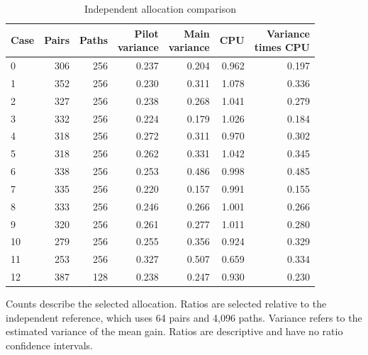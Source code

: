 \documentclass[11pt]{article}
\begin{document}
\begin{table}[htbp]
\centering\small
\caption{Independent allocation comparison}\label{tab:allocation-comparison}
\setlength{\tabcolsep}{4pt}
\begin{tabular}{lrrrrrr}
\toprule
Case & Pairs & Paths & \shortstack{Pilot\\variance} & \shortstack{Main\\variance} & CPU & \shortstack{Variance\\times CPU} \\
\midrule
0 & 306 & 256 & 0.237 & 0.204 & 0.962 & 0.197 \\
1 & 352 & 256 & 0.230 & 0.311 & 1.078 & 0.336 \\
2 & 327 & 256 & 0.238 & 0.268 & 1.041 & 0.279 \\
3 & 332 & 256 & 0.224 & 0.179 & 1.026 & 0.184 \\
4 & 318 & 256 & 0.272 & 0.311 & 0.970 & 0.302 \\
5 & 318 & 256 & 0.262 & 0.331 & 1.042 & 0.345 \\
6 & 338 & 256 & 0.253 & 0.486 & 0.998 & 0.485 \\
7 & 335 & 256 & 0.220 & 0.157 & 0.991 & 0.155 \\
8 & 333 & 256 & 0.246 & 0.266 & 1.001 & 0.266 \\
9 & 320 & 256 & 0.261 & 0.277 & 1.011 & 0.280 \\
10 & 279 & 256 & 0.255 & 0.356 & 0.924 & 0.329 \\
11 & 253 & 256 & 0.327 & 0.507 & 0.659 & 0.334 \\
12 & 387 & 128 & 0.238 & 0.247 & 0.930 & 0.230 \\
\bottomrule
\end{tabular}
\par\smallskip\begin{minipage}{\textwidth}\footnotesize Counts describe the selected allocation. Ratios are selected relative to the independent reference, which uses 64 pairs and 4,096 paths. Variance refers to the estimated variance of the mean gain. Ratios are descriptive and have no ratio confidence intervals.\end{minipage}
\end{table}
\end{document}
